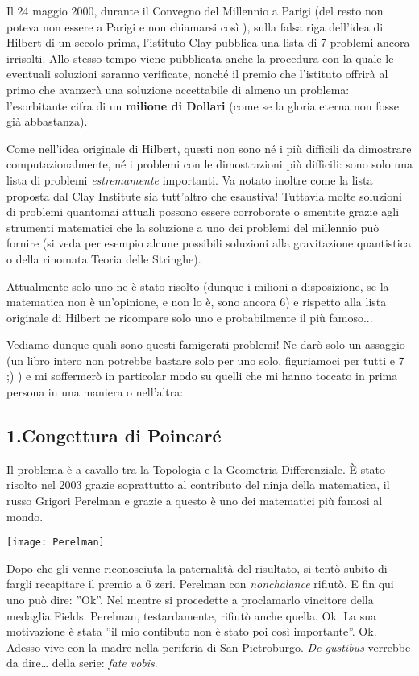 Il 24 maggio 2000, durante il Convegno del Millennio a Parigi (del resto non poteva non essere a Parigi e non chiamarsi così \smiley),  sulla falsa riga dell’idea di Hilbert di un secolo prima, l’istituto Clay pubblica una lista di 7 problemi ancora irrisolti. Allo stesso tempo viene pubblicata anche la procedura con la quale le eventuali soluzioni saranno verificate, nonché il premio che l’istituto offrirà al primo che avanzerà una soluzione accettabile di almeno un problema: l’esorbitante cifra di un \textbf{milione di Dollari} (come se la gloria eterna non fosse già abbastanza).

Come nell’idea originale di Hilbert, questi non sono né i più difficili da dimostrare computazionalmente, né i problemi con le dimostrazioni più difficili: sono solo una lista di problemi \emph{estremamente} importanti. Va notato inoltre come la lista proposta dal Clay Institute sia tutt’altro che esaustiva! Tuttavia molte soluzioni di problemi quantomai attuali possono essere corroborate o smentite grazie agli strumenti matematici che la soluzione a uno dei problemi del millennio può fornire (si veda per esempio alcune possibili soluzioni alla gravitazione quantistica o della rinomata Teoria delle Stringhe). 

Attualmente solo uno ne è stato risolto (dunque i milioni a disposizione, se la matematica non è un’opinione, e non lo è, sono ancora 6) e rispetto alla lista originale di Hilbert ne ricompare solo uno e probabilmente il più famoso...

Vediamo dunque quali sono questi famigerati problemi! Ne darò solo un assaggio (un libro intero non potrebbe bastare solo per uno solo, figuriamoci per tutti e 7 ;) ) e mi soffermerò in particolar modo su quelli che mi hanno toccato in prima persona in una maniera o nell’altra:

\subsection{1.Congettura di Poincaré}
Il problema è a cavallo tra la Topologia e la Geometria Differenziale. 
È stato risolto nel 2003 grazie soprattutto al contributo del ninja della matematica, il russo Grigori Perelman e grazie a questo è uno dei matematici più famosi al mondo.
\begin{marginfigure}%
	\texttt{[image: Perelman]}
	\caption{Grigorij Jakovlevi\v{c} Perel'man%
		; Leningrado, 13 giugno 1966)}
	\label{fig:perelman}
\end{marginfigure}
Dopo che gli venne riconosciuta la paternalità del risultato, si tentò subito di fargli recapitare  il premio a 6 zeri. Perelman con \emph{nonchalance} rifiutò. E fin qui uno può dire: ”Ok”. Nel mentre si procedette a proclamarlo vincitore della medaglia Fields. Perelman, testardamente, rifiutò anche quella. Ok. La sua motivazione è stata ”il mio contibuto non è stato poi così importante”. Ok. Adesso vive con la madre nella periferia di San Pietroburgo. \emph{De gustibus} verrebbe da dire… della serie: \emph{fate vobis}.
